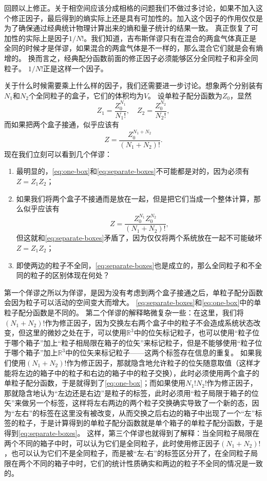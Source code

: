 \documentclass[hyperref, UTF8, a4paper]{ctexart}
\begin{document}
回顾以上修正。关于相空间应该分成相格的问题我们不做过多讨论，如果不加入这个修正因子，最后得到的熵实际上还是具有可加性的。加入这个因子的作用仅仅是为了确保通过经典统计物理计算出来的熵和量子统计的结果一致。
真正恢复了可加性的实际上是因子$1/N!$。我们知道，吉布斯佯谬只有在混合的两盒气体真正是全同的时候才是佯谬，如果混合的两盒气体是不一样的，那么混合它们就是会有熵增的。
换而言之，经典配分函数前面的修正因子必须能够区分全同粒子和非全同粒子。
$1/N!$正是这样一个因子。

关于什么时候需要乘上什么样的因子，我们还需要进一步讨论。想象两个分别装有$N_1$和$N_2$个全同粒子的盒子，它们的体积均为$V$。
设单粒子配分函数为$Z_0$，显然
\begin{equation}
    Z_1 = \frac{Z_0^{N_1}}{N_1!}, \quad Z_2 = \frac{Z_0^{N_2}}{N_2!},
    \label{eq:separate-boxes}
\end{equation}
而如果把两个盒子接通，似乎应该有
\begin{equation}
    Z = \frac{Z_0^{N_1+N_2}}{(N_1 + N_2)!}.
    \label{eq:one-box}
\end{equation}
现在我们立刻可以看到几个佯谬：
\begin{enumerate}
    \item 最明显的，\eqref{eq:one-box}和\eqref{eq:separate-boxes}不可能都是对的，因为必须有$Z = Z_1 Z_2$；
    \item 如果我们将两个盒子不接通而是放在一起，但是把它们当成一个整体计算，那么似乎应该有
    \[
        Z = \frac{Z_0^{N_1} Z_0^{N_2}}{(N_1+N_2)!},
    \]
    但这就和\eqref{eq:separate-boxes}矛盾了，因为仅仅将两个系统放在一起不可能破坏$Z=Z_1 Z_2$；
    \item 即使两边的粒子不全同，\eqref{eq:separate-boxes}也是成立的，那么全同粒子和不全同的粒子的区别体现在何处？
\end{enumerate}
第一个佯谬之所以为佯谬，是因为没有考虑到两个盒子接通之后，单粒子配分函数会因为粒子可以活动的空间变大而增大。
\eqref{eq:separate-boxes}和\eqref{eq:one-box}中的单粒子配分函数是不同的。
第二个佯谬的解释略微复杂一些：在这里，我们将$(N_1+N_2)!$作为修正因子，因为交换左右两个盒子中的粒子不会造成系统状态改变，但这里的微妙之处在于，可以使用$\mathbb{R}^3$中的位矢标记粒子，也可以使用“粒子位于哪个箱子”加上“粒子相局限在箱子的位矢”来标记粒子，但是不能够使用“粒子位于哪个箱子”加上$\mathbb{R}^3$中的位矢来标记粒子——这两个标签存在信息的重复。
如果我们使用$(N_1+N_2)!$作为修正因子，那就隐含地允许粒子的位矢随意取值（这样才能将左边的箱子中的粒子和右边的箱子中的粒子交换），此时必须使用两个盒子的单粒子配分函数，于是就得到了\eqref{eq:one-box}；而如果使用$N_1! N_2!$作为修正因子，那就隐含地认为“左边还是右边”是粒子的标签，此时必须用“粒子局限于箱子的位矢”来做另一个标签，这样将左右两边的两个粒子交换确实导致了一个新的态，因为“左右”的标签在这里没有被改变，从而交换之后右边的箱子中出现了一个“左”标签的粒子，于是计算得到的单粒子配分函数就是单个箱子的单粒子配分函数，于是得到\eqref{eq:separate-boxes}。
这样，第三个佯谬也就得到了解释：当全同粒子局限在两个不同的箱子中时，可以认为它们是全同粒子，此时使用修正因子$(N_1+N_2)!$，也可以认为它们不是全同粒子，而是被“左-右”的标签区分开了，在全同粒子局限在两个不同的箱子中时，它们的统计性质确实和两边的粒子不全同的情况是一致的。
\end{document}
